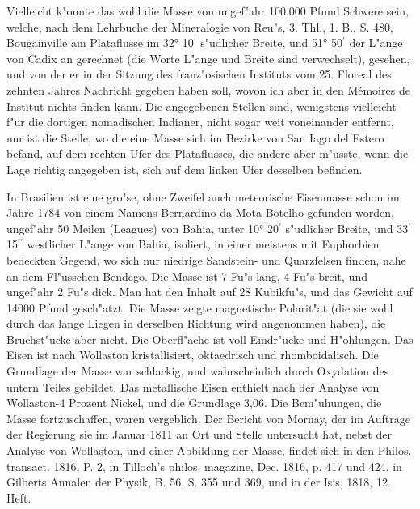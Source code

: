 \documentclass[a4paper, 11pt, oneside, polutonikogreek, german]{article}
\begin{document}
Vielleicht k"onnte das wohl die Masse von ungef"ahr 100,000 Pfund Schwere sein, welche, nach dem Lehrbuche der Mineralogie von Reu"s, 3. Thl., 1. B., S. 480, Bougainville am Plataflusse im 32° 10$^{\prime}$ s"udlicher Breite, und 51° 50$^{\prime}$ der L"ange von Cadix an gerechnet (die Worte L"ange und Breite sind verwechselt), gesehen, und von der er in der Sitzung des franz"osischen Instituts vom 25. Floreal des zehnten Jahres Nachricht gegeben haben soll, wovon ich aber in den Mémoires de Institut nichts finden kann. Die angegebenen Stellen sind, wenigstens vielleicht f"ur die dortigen nomadischen Indianer, nicht sogar weit voneinander entfernt, nur ist die Stelle, wo die eine Masse sich im Bezirke von San Iago del Estero befand, auf dem rechten Ufer des Plataflusses, die andere aber m"usste, wenn die Lage richtig angegeben ist, sich auf dem linken Ufer desselben befinden.

In Brasilien ist eine gro"se, ohne Zweifel auch meteorische Eisenmasse schon im Jahre 1784 von einem Namens Bernardino da Mota Botelho gefunden worden, ungef"ahr 50 Meilen (Leagues) von Bahia, unter 10° 20$^{\prime}$ s"udlicher Breite, und 33$^{\prime}$ 15$^{\prime\prime}$ westlicher L"ange von Bahia, isoliert, in einer meistens mit Euphorbien bedeckten Gegend, wo sich nur niedrige Sandstein- und Quarzfelsen finden, nahe an dem Fl"usschen Bendego. Die Masse ist 7 Fu"s lang, 4 Fu"s breit, und ungef"ahr 2 Fu"s dick. Man hat den Inhalt auf 28 Kubikfu"s, und das Gewicht auf 14000 Pfund gesch"atzt. Die Masse zeigte magnetische Polarit"at (die sie wohl durch das lange Liegen in derselben Richtung wird angenommen haben), die Bruchst"ucke aber nicht. Die Oberfl"ache ist voll Eindr"ucke und H"ohlungen. Das Eisen ist nach Wollaston kristallisiert, oktaedrisch und rhomboidalisch. Die Grundlage der Masse war schlackig, und wahrscheinlich durch Oxydation des untern Teiles gebildet. Das metallische Eisen enthielt nach der Analyse von Wollaston-4 Prozent Nickel, und die Grundlage 3,06. Die Bem"uhungen, die Masse fortzuschaffen, waren vergeblich. Der Bericht von Mornay, der im Auftrage der Regierung sie im Januar 1811 an Ort und Stelle untersucht hat, nebst der Analyse von Wollaston, und einer Abbildung der Masse, findet sich in den Philos. transact. 1816, P. 2, in Tilloch's philos. magazine, Dec. 1816, p. 417 und 424, in Gilberts Annalen der Physik, B. 56, S. 355 und 369, und in der Isis, 1818, 12. Heft.
\end{document}
